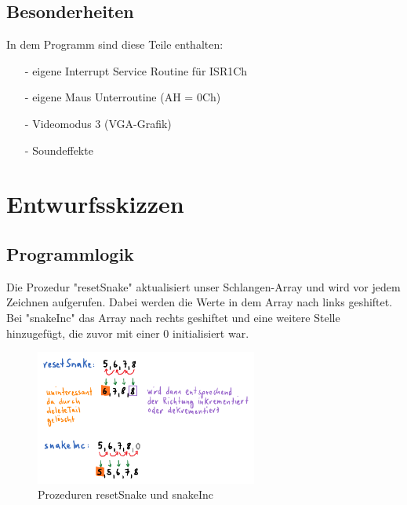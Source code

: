 \documentclass[a4paper,10pt]{article}
\begin{document}
		\subsection{Besonderheiten}
			In dem Programm sind diese Teile enthalten:
			\begin{itemize}
				\item[-] eigene Interrupt Service Routine für ISR1Ch
				\item[-] eigene Maus Unterroutine (AH = 0Ch)
				\item[-] Videomodus 3 (VGA-Grafik)
				\item[-] Soundeffekte
			\end{itemize}
		\newpage
	\section{Entwurfsskizzen}
		
		\subsection{Programmlogik}
			Die Prozedur "\-resetSnake" \- aktualisiert unser
			Schlangen-Array und wird vor jedem Zeichnen aufgerufen. Dabei 
			werden die Werte in dem Array nach links geshiftet. \\
			Bei "snakeInc" \- das Array nach rechts geshiftet und eine weitere 
			Stelle hinzugefügt, die zuvor mit einer 0 initialisiert war. \\
			\begin{figure}[h]
				\centering
				\includegraphics[width=0.65\textwidth]{prog}
				\caption{Prozeduren resetSnake und snakeInc}
				\label{SnakPro}
			\end{figure}
			
\end{document}
